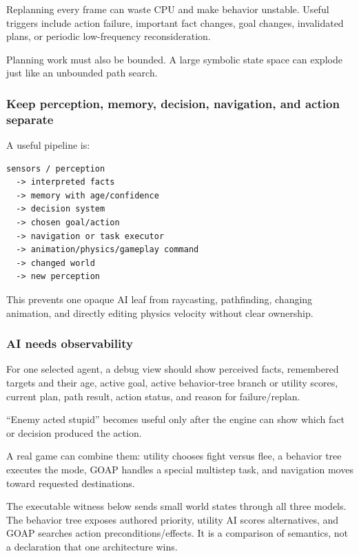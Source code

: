 Replanning every frame can waste CPU and make behavior unstable. Useful triggers include action failure, important fact changes, goal changes, invalidated plans, or periodic low-frequency reconsideration.

Planning work must also be bounded. A large symbolic state space can explode just like an unbounded path search.

\subsubsection{Keep perception, memory, decision, navigation, and action separate}\label{keep-perception-memory-decision-navigation-and-action-separate}

A useful pipeline is:

\begin{verbatim}
sensors / perception
  -> interpreted facts
  -> memory with age/confidence
  -> decision system
  -> chosen goal/action
  -> navigation or task executor
  -> animation/physics/gameplay command
  -> changed world
  -> new perception
\end{verbatim}

This prevents one opaque AI leaf from raycasting, pathfinding, changing animation, and directly editing physics velocity without clear ownership.

\subsubsection{AI needs observability}\label{ai-needs-observability}

For one selected agent, a debug view should show perceived facts, remembered targets and their age, active goal, active behavior-tree branch or utility scores, current plan, path result, action status, and reason for failure/replan.

``Enemy acted stupid'' becomes useful only after the engine can show which fact or decision produced the action.

A real game can combine them: utility chooses fight versus flee, a behavior tree executes the mode, GOAP handles a special multistep task, and navigation moves toward requested destinations.

The executable witness below sends small world states through all three models. The behavior tree exposes authored priority, utility AI scores alternatives, and GOAP searches action preconditions/effects. It is a comparison of semantics, not a declaration that one architecture wins.

